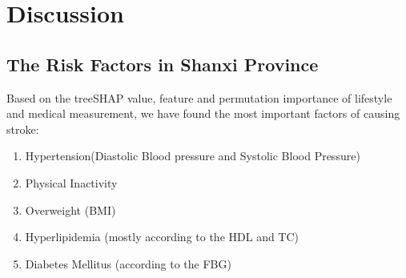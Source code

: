 \documentclass{article}
\begin{document}
\section{Discussion}\label{section:dicuss}
\subsection{The Risk Factors in Shanxi Province}
Based on the treeSHAP value, feature and permutation importance of lifestyle and medical measurement, we have found the most important factors of causing   stroke: 
\begin{enumerate}
    \setlength{\itemsep}{0pt}
    \setlength{\parsep}{0pt}
    \setlength{\parskip}{0pt}
    \item Hypertension(Diastolic Blood pressure and Systolic Blood Pressure)
    \item Physical Inactivity
    \item Overweight (BMI)
    \item Hyperlipidemia (mostly according to the HDL and TC)
    \item Diabetes Mellitus (according to the FBG)
\end{enumerate}
\end{document}
